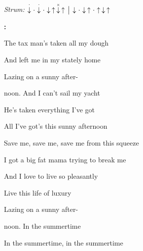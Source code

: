 \begin{song}


\begin{headerbox}
\RaiseBoxWithChucks
\textit{Strum:} $\StaccatoDown\Miss\StaccatoDown\Miss\Down\Up\ChuckDown\Up
\Separator \Down\Miss\Down\Up\Miss\Up\Down\Up$
\end{headerbox}

\begin{chordbox}
\end{chordbox}

\large

\bigskip

\Intro\textbf{:}     \par

\bigskip

The tax man's taken all my dough \par
And left me in my stately home \par
{}Lazing on a sunny after- \par
{}noon. And I can't sail my yacht \par
He's taken everything I've got \par
{}All I've got's this sunny afternoon \par

\bigskip

Save me, save me, save me from this squeeze \par
I got a big fat mama trying to break me  \par

\bigskip

\begin{chorusbox}{\Chorus}
And I love to live so pleasantly \par
{}Live this life of luxury  \par
{}Lazing on a sunny after- \par
{}noon. In the summertime \par
In the summertime, in the summertime \par
\end{chorusbox}


\end{song}
